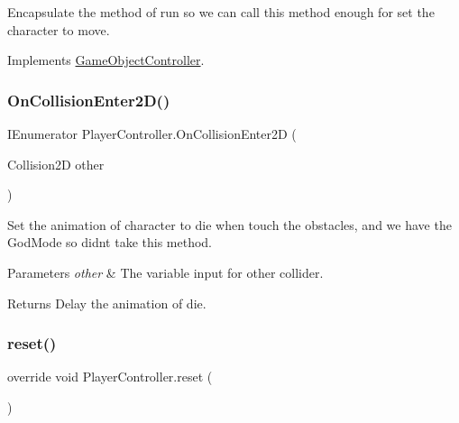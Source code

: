 Encapsulate the method of run so we can call this method enough for set the character to move. 



Implements \hyperlink{class_game_object_controller_a0d186d143e280869efaff7835730fc82}{Game\+Object\+Controller}.

\hypertarget{class_player_controller_ab151f95651ed2108c880150f6c68e335}{}\label{class_player_controller_ab151f95651ed2108c880150f6c68e335} 
\subsubsection{\texorpdfstring{On\+Collision\+Enter2\+D()}{OnCollisionEnter2D()}}
{\footnotesize\ttfamily I\+Enumerator Player\+Controller.\+On\+Collision\+Enter2D (\begin{DoxyParamCaption}\item[{Collision2D}]{other }\end{DoxyParamCaption})\hspace{0.3cm}{\ttfamily [private]}}



Set the animation of character to die when touch the obstacles, and we have the God\+Mode so didn\textquotesingle{}t take this method. 


\begin{DoxyParams}{Parameters}
{\em other} & The variable input for other collider.\\
\hline
\end{DoxyParams}
\begin{DoxyReturn}{Returns}
Delay the animation of die.
\end{DoxyReturn}
\hypertarget{class_player_controller_a8fd9b4a9dc641b4b4c9ca0949f083b41}{}\label{class_player_controller_a8fd9b4a9dc641b4b4c9ca0949f083b41} 
\subsubsection{\texorpdfstring{reset()}{reset()}}
{\footnotesize\ttfamily override void Player\+Controller.\+reset (\begin{DoxyParamCaption}{ }\end{DoxyParamCaption})\hspace{0.3cm}{\ttfamily [virtual]}}




